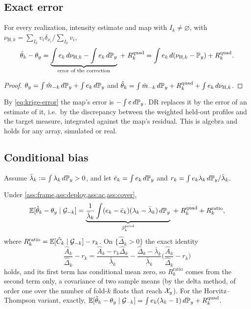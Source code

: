 \subsection{Exact error}

\begin{theorem}\label{thm:realized}
For every realization, intensity estimate and map with $I_k\neq\varnothing$, with
$\nu_{\mathrm H,k}=\sum_{I_k}v_i\delta_{x_i}/\sum_{I_k}v_i$,
\[
  \hat\theta_k-\theta_y
  =\underbrace{\int e_k\,d\nu_{\mathrm H,k}-\int e_k\,d\mathbb{P}_y}_{\text{error of the correction}}\;+\;R^{\mathrm{quad}}_k
  =\int e_k\,d(\nu_{\mathrm H,k}-\mathbb{P}_y)+R^{\mathrm{quad}}_k .
\]
\end{theorem}

\begin{proof}
$\theta_y=\int\hat m_{-k}\,d\mathbb{P}_y+\int e_k\,d\mathbb{P}_y$ and
$\hat\theta_k=\int\hat m_{-k}\,d\mathbb{P}_y+R^{\mathrm{quad}}_k+\int e_k\,d\nu_{\mathrm H,k}$.
\end{proof}

By \eqref{eq:krige-error} the map's error is $-\int e\,d\mathbb{P}_y$. DR replaces it by the error of an
estimate of it, i.e.\ by the discrepancy between the weighted held-out profiles and the target measure,
integrated against the map's residual. This is algebra and holds for any array, simulated or real.

\subsection{Conditional bias}

Assume $\bar\lambda_k:=\int\lambda_k\,d\mathbb{P}_y>0$, and let $\bar e_k=\int e_k\,d\mathbb{P}_y$ and
$r_k=\int e_k\lambda_k\,d\mathbb{P}_y/\bar\lambda_k$.

\begin{theorem}\label{thm:bias}
Under \cref{ass:frame,ass:deploy,ass:ac,ass:cover},
\[
  \mathbb{E}[\hat\theta_k-\theta_y\mid\mathcal G_{-k}]
  =\underbrace{\frac1{\bar\lambda_k}\int(e_k-\bar e_k)(\lambda_k-\bar\lambda_k)\,d\mathbb{P}_y}_{\beta^{\mathrm{prod}}_k}
  \;+\;R^{\mathrm{quad}}_k+R^{\mathrm{ratio}}_k ,
\]
where $R^{\mathrm{ratio}}_k=\mathbb{E}[\hat C_k\mid\mathcal G_{-k}]-r_k$. On $\{\hat\Delta_k>0\}$ the exact
identity
\[
  \frac{\hat A_k}{\hat\Delta_k}-r_k=\frac{\hat A_k-r_k\hat\Delta_k}{\bar\lambda_k}
  -\frac{\hat\Delta_k-\bar\lambda_k}{\bar\lambda_k}\Big(\frac{\hat A_k}{\hat\Delta_k}-r_k\Big)
\]
holds, and its first term has conditional mean zero, so $R^{\mathrm{ratio}}_k$ comes from the second
term only, a covariance of two sample means (by the delta method, of order one over the number of
fold-$k$ floats that reach $\mathcal{X}_y$). For the Horvitz--Thompson variant, exactly,
$\mathbb{E}[\tilde\theta_k-\theta_y\mid\mathcal G_{-k}]=\int e_k(\lambda_k-1)\,d\mathbb{P}_y+R^{\mathrm{quad}}_k$.
\end{theorem}

